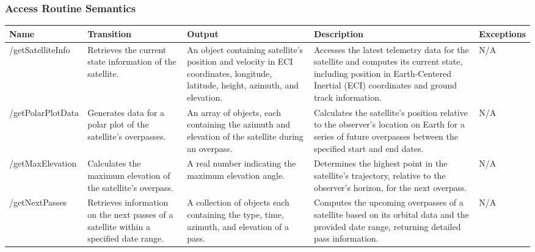 \documentclass[12pt, titlepage]{article}
\begin{document}
\subsubsection{Access Routine Semantics}

\begin{center}
\begin{tabular}{|p{3.2cm} |p{3cm} | p{3.6cm} |p{4cm} |p{2.7cm}|}
\hline
\textbf{Name} & \textbf{Transition} & \textbf{Output} & \textbf{Description} & \textbf{Exceptions} \\
\hline
/getSatelliteInfo & Retrieves the current state information of the satellite. & An object containing satellite's position and velocity in ECI coordinates, longitude, latitude, height, azimuth, and elevation. & Accesses the latest telemetry data for the satellite and computes its current state, including position in Earth-Centered Inertial (ECI) coordinates and ground track information. & N/A \\
\hline
/getPolarPlotData & Generates data for a polar plot of the satellite's overpasses. & An array of objects, each containing the azimuth and elevation of the satellite during an overpass. & Calculates the satellite's position relative to the observer's location on Earth for a series of future overpasses between the specified start and end dates. & N/A \\
\hline

/getMaxElevation & Calculates the maximum elevation of the satellite's overpass. & A real number indicating the maximum elevation angle. & Determines the highest point in the satellite's trajectory, relative to the observer's horizon, for the next overpass. & N/A \\
\hline

/getNextPasses & Retrieves information on the next passes of a satellite within a specified date range. &A collection of objects each containing the type, time, azimuth, and elevation of a pass. & Computes the upcoming overpasses of a satellite based on its orbital data and the provided date range, returning detailed pass information. & N/A \\
\hline
\end{tabular}
\end{center}
\end{document}
